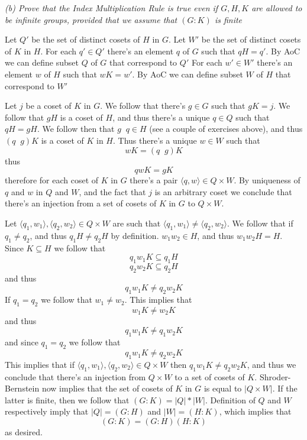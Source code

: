 \documentclass[11pt,oneside,titlepage]{book}
\DeclareMathOperator \inv {^{-1}}
\newcommand{\eangle}[1]{\langle #1 \rangle}
\begin{document}
\textit{(b) Prove that the Index Multiplication Rule is true even if
  $G, H, K$ are allowed to be infinite groups, provided that we assume
  that $(G:K)$ is finite}

Let $Q'$ be the set of distinct cosets of $H$ in $G$.  Let $W'$ be the
set of distinct cosets of $K$ in $H$.  For each $q' \in Q'$ there's an
element $q$ of $G$ such that $qH = q'$. By AoC we can define subset
$Q$ of $G$ that correspond to $Q'$ For each $w' \in W'$ there's an
element $w$ of $H$ such that $wK = w'$. By AoC we can define subset
$W$ of $H$ that correspond to $W'$

Let $j$ be a coset of $K$ in $G$. We follow that there's $g \in G$
such that $gK = j$. We follow that $gH$ is a coset of $H$, and thus
there's a unique $q \in Q$ such that $qH = gH$. We follow then that
$g\inv q \in H$ (see a couple of exercises above), and thus $(q\inv g)
K$ is a coset of $K$ in $H$. Thus there's a unique $w \in W$ such that
$$w K = (q\inv g ) K$$
thus
$$q w K = gK$$
therefore for each coset of $K$ in $G$ there's a pair $\eangle{q, w}
\in Q \times W$. By uniqueness of $q$ and $w$ in $Q$ and $W$,
and the fact that $j$ is an arbitrary coset we
conclude that there's an injection from a set
of cosets of $K$ in $G$ to $Q \times W$.

Let $\eangle{q_1, w_1}, \eangle{q_2, w_2} \in Q \times W$ are such that
$\eangle{q_1, w_1} \neq \eangle{q_2, w_2}$. We follow that
if $q_1 \neq q_2$, and thus $q_1 H \neq q_2 H$ by definition.
$w_1 w_2 \in H$, and thus $w_1 w_2 H = H$. Since $K \subseteq H$ we follow that
$$q_1 w_1 K \subseteq q_1 H$$
$$q_2 w_2 K \subseteq q_2 H$$
and thus
$$q_1 w_1 K \neq q_2 w_2 K$$
If $q_1 = q_2$ we follow that $w_1 \neq w_2$. This implies that
$$w_1 K \neq w_2 K$$
and thus
$$q_1 w_1 K \neq q_1 w_2 K$$
and since $q_1 = q_2$ we follow that
$$q_1 w_1 K \neq q_2 w_2 K$$
This implies that if $\eangle{q_1, w_1}, \eangle{q_2, w_2} \in Q \times W$ then
$q_1 w_1 K \neq q_2 w_2 K$, and thus we conclude that there's an injection from
$Q \times W$ to a set of cosets of $K$. Shroder-Bernstein now implies that
the set of cosets of $K$ in $G$ is equal to $|Q \times W|$. If the latter is finite,
then we follow that $(G:K) = |Q| * |W|$. Definition of $Q$ and $W$ respectively
imply that $|Q| = (G:H)$ and $|W| = (H:K)$, which implies that
$$(G:K) = (G:H) (H:K)$$
as desired.

\subsection{}
\end{document}
